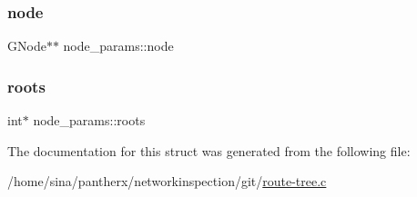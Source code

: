 \mbox{\label{structnode__params_a86b07f6f7d575e6b84723fbe1540771f}} 
\subsubsection{\texorpdfstring{node}{node}}
{\footnotesize\ttfamily G\+Node$\ast$$\ast$ node\+\_\+params\+::node}

\mbox{\label{structnode__params_a5a78aaca912a055ee5920a7b222b0fd1}} 
\subsubsection{\texorpdfstring{roots}{roots}}
{\footnotesize\ttfamily int$\ast$ node\+\_\+params\+::roots}



The documentation for this struct was generated from the following file\+:\begin{DoxyCompactItemize}
\item 
/home/sina/pantherx/networkinspection/git/\hyperlink{route-tree_8c}{route-\/tree.\+c}\end{DoxyCompactItemize}
